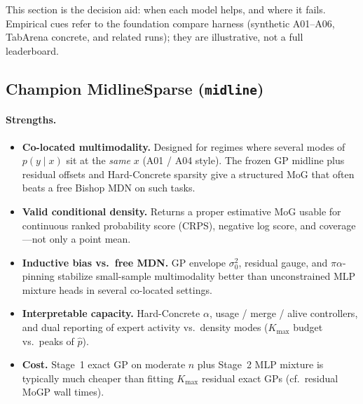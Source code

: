 \documentclass[11pt,a4paper]{article}
\newcommand{\Kmax}{K_{\max}}
\theoremstyle{definition}
\begin{document}
This section is the decision aid: when each model helps, and where it fails.
Empirical cues refer to the foundation compare harness (synthetic A01--A06,
TabArena concrete, and related runs); they are illustrative, not a full
leaderboard.

\subsection{Champion MidlineSparse (\texttt{midline})}

\paragraph{Strengths.}
\begin{itemize}[leftmargin=1.2em,itemsep=2pt]
\item \textbf{Co-located multimodality.} Designed for regimes where several
  modes of $p(y\mid x)$ sit at the \emph{same} $x$ (A01 / A04 style). The frozen
  GP midline plus residual offsets and Hard-Concrete sparsity give a structured
  MoG that often beats a free Bishop MDN on such tasks.
\item \textbf{Valid conditional density.} Returns a proper estimative MoG usable
  for continuous ranked probability score (CRPS), negative log score, and
  coverage---not only a point mean.
\item \textbf{Inductive bias vs.\ free MDN.} GP envelope $\sigma_0^2$, residual
  gauge, and $\pi\alpha$-pinning stabilize small-sample multimodality better than
  unconstrained MLP mixture heads in several co-located settings.
\item \textbf{Interpretable capacity.} Hard-Concrete $\alpha$, usage / merge /
  alive controllers, and dual reporting of expert activity vs.\ density modes
  (\(\Kmax\) budget vs.\ peaks of $\hat p$).
\item \textbf{Cost.} Stage~1 exact GP on moderate $n$ plus Stage~2 MLP mixture
  is typically much cheaper than fitting $\Kmax$ residual exact GPs
  (cf.\ residual MoGP wall times).
\end{itemize}
\end{document}
